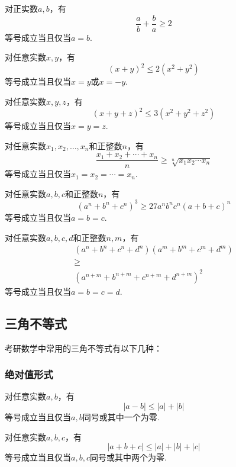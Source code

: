 对正实数$a,b$，有
\begin{equation}
	\dfrac{a}{b}+\dfrac{b}{a} \geq 2
\end{equation}
等号成立当且仅当$a=b$.

对任意实数$x,y$，有
\begin{equation}
	(x+y)^2 \leq 2(x^2+y^2)
\end{equation}
等号成立当且仅当$x=y$或$x=-y$.

对任意实数$x,y,z$，有
\begin{equation}
	(x+y+z)^2 \leq 3(x^2+y^2+z^2)
\end{equation}
等号成立当且仅当$x=y=z$.

对任意实数$x_1,x_2,\dots,x_n$和正整数$n$，有
\begin{equation}
	\dfrac{x_1+x_2+\cdots+x_n}{n} \geq \sqrt[n]{x_1x_2\cdots x_n}
\end{equation}
等号成立当且仅当$x_1=x_2=\cdots=x_n$.

对任意实数$a,b,c$和正整数$n$，有
\begin{equation}
	(a^n+b^n+c^n)^3 \geq 27a^nb^nc^n(a+b+c)^n
\end{equation}
等号成立当且仅当$a=b=c$.

对任意实数$a,b,c,d$和正整数$n,m$，有
\begin{equation}
	\begin{array}{c}
		(a^n+b^n+c^n+d^n)(a^m+b^m+c^m+d^m)\\ \geq \\(a^{n+m}+b^{n+m}+c^{n+m}+d^{n+m})^2
	\end{array}
\end{equation}
等号成立当且仅当$a=b=c=d$.

\subsection{三角不等式}
考研数学中常用的三角不等式有以下几种：

\subsubsection{绝对值形式}
对任意实数$a,b$，有
\begin{equation}
	|a-b| \leq |a|+|b|
\end{equation}
等号成立当且仅当$a,b$同号或其中一个为零.

对任意实数$a,b,c$，有
\begin{equation}
	|a+b+c| \leq |a|+|b|+|c|
\end{equation}
等号成立当且仅当$a,b,c$同号或其中两个为零.

